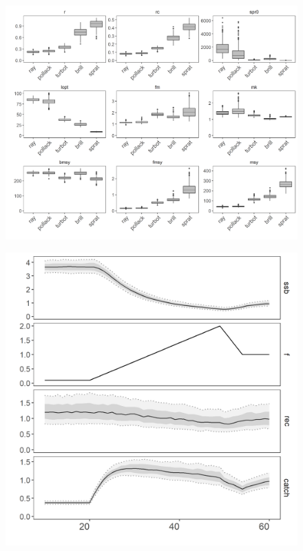 \documentclass[preprint,review,12pt]{elsarticle}
\begin{document}
\begin{figure}[]\centering\includegraphics[width=5in]{fig3.png}\caption{}\label{fig:fig3}\end{figure}
\begin{figure}[]\centering\includegraphics[width=5in]{fig4.png}\caption{}\label{fig:fig4}\end{figure}
\end{document}
